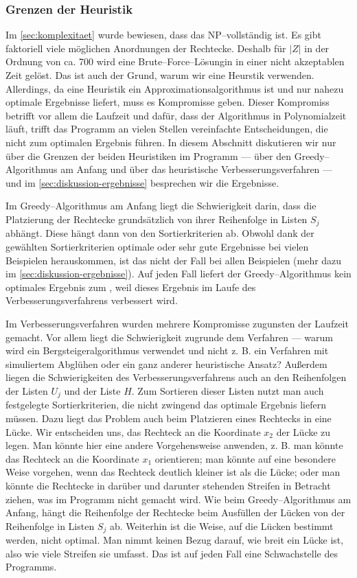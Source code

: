 \subsubsection{Grenzen der Heuristik}\label{sec:diskussion-grenzen}
Im \cref{sec:komplexitaet} wurde bewiesen, dass das \fp{} NP--vollständig ist.
Es gibt faktoriell viele möglichen Anordnungen der Rechtecke.
Deshalb für $|Z|$ in der Ordnung von ca. 700 wird eine Brute--Force--Lösungin in einer nicht
akzeptablen Zeit gelöst.
Das ist auch der Grund, warum wir eine Heurstik verwenden.
Allerdings, da eine Heuristik ein Approximationsalgorithmus ist und
nur nahezu optimale Ergebnisse liefert, muss es Kompromisse geben.
Dieser Kompromiss betrifft vor allem die Laufzeit und 
dafür, dass der Algorithmus in Polynomialzeit läuft, 
trifft das Programm an vielen Stellen vereinfachte Entscheidungen,
die nicht zum optimalen Ergebnis führen.
In diesem Abschnitt diskutieren wir nur über die Grenzen der beiden Heuristiken im Programm 
--- über den Greedy--Algorithmus am Anfang und über das heuristische 
Verbesserungsverfahren ---
und im \cref{sec:diskussion-ergebnisse} besprechen wir die Ergebnisse.


Im Greedy--Algorithmus am Anfang liegt die Schwierigkeit darin, dass
die Platzierung der Rechtecke grundsätzlich von ihrer Reihenfolge 
in Listen $S_j$ abhängt. Diese hängt dann von den Sortierkriterien ab. 
Obwohl dank der gewählten Sortierkriterien optimale oder sehr gute Ergebnisse
bei vielen Beispielen herauskommen, ist das nicht der Fall bei allen Beispielen
(mehr dazu im \cref{sec:diskussion-ergebnisse}).
Auf jeden Fall liefert der Greedy--Algorithmus kein optimales Ergebnis zum ,
weil dieses Ergebnis im Laufe des Verbesserungsverfahrens verbessert wird.


Im Verbesserungsverfahren wurden mehrere Kompromisse zugunsten der Laufzeit gemacht.
Vor allem liegt die Schwierigkeit zugrunde dem Verfahren --- warum wird ein Bergsteigeralgorithmus verwendet
und nicht z. B. ein Verfahren mit simuliertem Abglühen oder ein ganz anderer heuristische Ansatz?
Außerdem liegen die Schwierigkeiten des Verbesserungsverfahrens auch an
den Reihenfolgen der Listen $U_j$ und der Liste $H$.
Zum Sortieren dieser Listen nutzt man auch festgelegte Sortierkriterien,
die nicht zwingend das optimale Ergebnis liefern müssen.
Dazu liegt das Problem auch beim Platzieren eines Rechtecks in eine Lücke. 
Wir entscheiden uns, das Rechteck an die Koordinate $x_2$ der Lücke zu legen.
Man könnte hier eine andere Vorgehensweise anwenden, z. B. man könnte das
Rechteck an die Koordinate $x_1$ orientieren; man könnte auf eine besondere
Weise vorgehen, wenn das Rechteck deutlich kleiner ist als die Lücke; oder
man könnte die Rechtecke in darüber und darunter stehenden Streifen in Betracht ziehen, 
was im Programm nicht gemacht wird.
Wie beim Greedy--Algorithmus am Anfang, hängt die Reihenfolge der Rechtecke 
beim Ausfüllen der Lücken von der Reihenfolge in Listen $S_j$ ab. 
Weiterhin ist die Weise, auf die Lücken bestimmt werden, nicht optimal. 
Man nimmt keinen Bezug darauf, wie breit ein Lücke ist, also wie viele Streifen sie umfasst.
Das ist auf jeden Fall eine Schwachstelle des Programms.